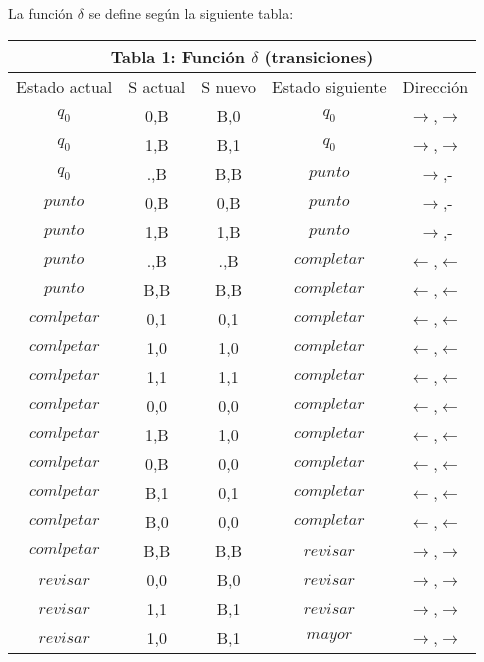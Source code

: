 \documentclass[12pt]{article}
\begin{document}
La función $\delta$ se define según la siguiente tabla:\\

\begin{center}
	\begin{tabular}{ |c|c|c|c|c| }
		\hline
		\multicolumn{5}{|c|}{\textbf{Tabla 1: Función $\delta$ (transiciones)}}\\
		\hline
		Estado actual & S actual & S nuevo & Estado siguiente & Dirección\\
		\hline
		$q_{0}$ & 0,B & B,0 & $q_{0}$ & $\rightarrow$,$\rightarrow$\\
		$q_{0}$ & 1,B & B,1 & $q_{0}$ & $\rightarrow$,$\rightarrow$\\
		$q_{0}$ & .,B & B,B & $punto$ & $\rightarrow$,-\\
		\hline
		$punto$ & 0,B & 0,B & $punto$ & $\rightarrow$,-\\
		$punto$ & 1,B & 1,B & $punto$ & $\rightarrow$,-\\
		$punto$ & .,B & .,B & $completar$ & $\leftarrow$,$\leftarrow$\\
		$punto$ & B,B & B,B & $completar$ & $\leftarrow$,$\leftarrow$\\
		\hline
		$comlpetar$ & 0,1 & 0,1 & $completar$ & $\leftarrow$,$\leftarrow$\\
		$comlpetar$ & 1,0 & 1,0 & $completar$ & $\leftarrow$,$\leftarrow$\\
		$comlpetar$ & 1,1 & 1,1 & $completar$ & $\leftarrow$,$\leftarrow$\\
		$comlpetar$ & 0,0 & 0,0 & $completar$ & $\leftarrow$,$\leftarrow$\\
		$comlpetar$ & 1,B & 1,0 & $completar$ & $\leftarrow$,$\leftarrow$\\
		$comlpetar$ & 0,B & 0,0 & $completar$ & $\leftarrow$,$\leftarrow$\\
		$comlpetar$ & B,1 & 0,1 & $completar$ & $\leftarrow$,$\leftarrow$\\
		$comlpetar$ & B,0 & 0,0 & $completar$ & $\leftarrow$,$\leftarrow$\\
		$comlpetar$ & B,B & B,B & $revisar$ & $\rightarrow$,$\rightarrow$\\
		\hline
		$revisar$ & 0,0 & B,0 & $revisar$ & $\rightarrow$,$\rightarrow$\\
		$revisar$ & 1,1 & B,1 & $revisar$ & $\rightarrow$,$\rightarrow$\\
		$revisar$ & 1,0 & B,1 & $mayor$ & $\rightarrow$,$\rightarrow$\\
		\hline
	\end{tabular} 
\end{center}
\end{document}
